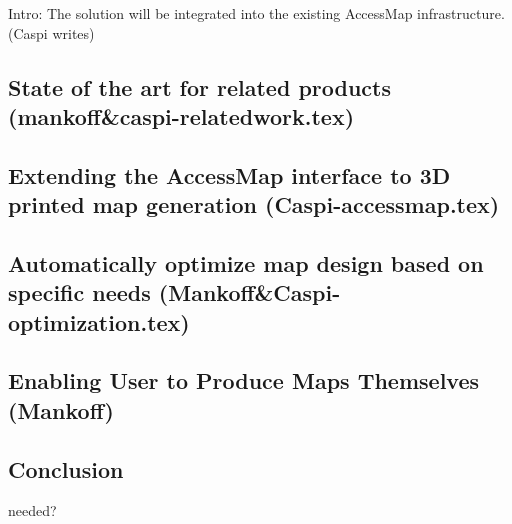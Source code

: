 Intro: The solution will be integrated into the existing AccessMap infrastructure.
(Caspi writes)


\subsection{State of the art for related products (mankoff\&caspi-relatedwork.tex)}


\subsection{Extending the AccessMap interface to 3D printed map generation (Caspi-accessmap.tex)}


\subsection{Automatically optimize map design based on specific needs (Mankoff\&Caspi-optimization.tex)}

\subsection{Enabling User to Produce Maps Themselves (Mankoff)}


\subsection{Conclusion}
needed?